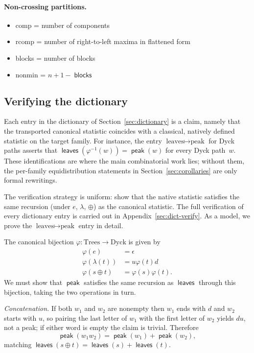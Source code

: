 \documentclass[a4paper,11pt]{article}
\theoremstyle{definition}
\DeclareMathOperator{\leaves}{\mathsf{leaves}}
\DeclareMathOperator{\peak}{\mathsf{peak}}
\DeclareMathOperator{\blocks}{\mathsf{blocks}}
\begin{document}
\paragraph{Non-crossing partitions.}
\begin{itemize}
\item comp = number of components
\item rcomp = number of right-to-left maxima in flattened
  form
\item blocks = number of blocks
\item nonmin = $n + 1 - \blocks$
\end{itemize}

\subsection{Verifying the dictionary}\label{sec:transport}

Each entry in the dictionary of Section~\ref{sec:dictionary}
is a claim, namely that the
transported canonical statistic coincides with a
classical, natively defined statistic on the target family. For
instance, the entry $\text{leaves} \mapsto \text{peak}$
for Dyck paths asserts that
$\leaves(\varphi^{-1}(w)) = \peak(w)$ for every Dyck
path~$w$. These
identifications are where the main combinatorial work
lies; without them, the per-family equidistribution
statements in Section~\ref{sec:corollaries} are only formal rewritings.

The verification strategy is uniform: show that the
native statistic satisfies the same recursion (under $e$,
$\lambda$, $\oplus$) as the canonical statistic. The full
verification of every dictionary entry is carried out in
Appendix~\ref{sec:dict-verify}. As a model, we prove the
$\text{leaves} \mapsto \text{peak}$ entry in detail.

The canonical bijection
$\varphi : \text{Trees} \to \text{Dyck}$ is given by
\begin{align*}
  \varphi(e) &= \epsilon \\
  \varphi(\lambda(t)) &= u \varphi(t) d \\
  \varphi(s \oplus t)
    &= \varphi(s) \varphi(t).
\end{align*}
We must show that $\peak$ satisfies the same recursion
as $\leaves$ through this bijection, taking the two
operations in turn.

\emph{Concatenation.} If both $w_1$ and $w_2$ are
nonempty then $w_1$ ends with $d$ and $w_2$ starts
with $u$, so pairing the last letter of $w_1$ with
the first letter of $w_2$ yields $du$, not a peak;
if either word is empty the claim is trivial. Therefore
\[
  \peak(w_1 w_2)
    = \peak(w_1) + \peak(w_2),
\]
matching
$\leaves(s \oplus t) = \leaves(s) + \leaves(t)$.
\end{document}
